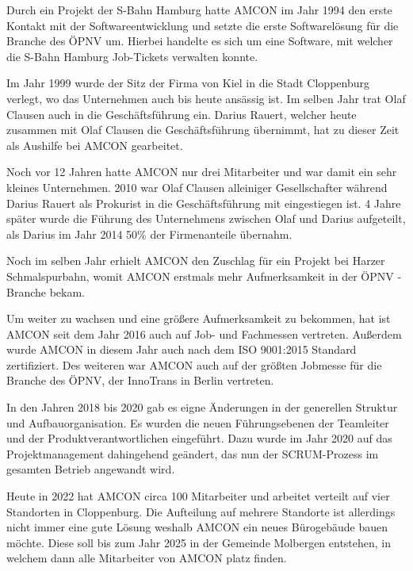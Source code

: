         Durch ein Projekt der S-Bahn Hamburg  hatte AMCON im Jahr 1994 den erste Kontakt mit der Softwareentwicklung
        und setzte die erste Softwarelösung für die Branche des ÖPNV um. Hierbei handelte es sich um eine Software, mit
        welcher die S-Bahn Hamburg Job-Tickets verwalten konnte.

        Im Jahr 1999 wurde der Sitz der Firma von Kiel in die Stadt Cloppenburg verlegt, wo das Unternehmen auch bis 
        heute ansässig ist. Im selben Jahr trat Olaf Clausen auch in die Geschäftsführung ein. Darius Rauert, welcher 
        heute zusammen mit Olaf Clausen die Geschäftsführung übernimmt, hat zu dieser Zeit als Aushilfe bei AMCON 
        gearbeitet.

        Noch vor 12 Jahren hatte AMCON nur drei Mitarbeiter und war damit ein sehr kleines Unternehmen. 2010 war Olaf
        Clausen alleiniger Gesellschafter während Darius Rauert als Prokurist in die Geschäftsführung mit eingestiegen
        ist. 4 Jahre später wurde die Führung des Unternehmens zwischen Olaf und Darius aufgeteilt, als Darius im Jahr
        2014 50\% der Firmenanteile übernahm.

        Noch im selben Jahr erhielt AMCON den Zuschlag für ein Projekt bei Harzer Schmalspurbahn, womit AMCON erstmals
        mehr Aufmerksamkeit in der ÖPNV - Branche bekam.

        Um weiter zu wachsen und eine größere Aufmerksamkeit zu bekommen, hat ist AMCON seit dem Jahr 2016 auch auf 
        Job- und Fachmessen vertreten. Außerdem wurde AMCON in diesem Jahr auch nach dem ISO 9001:2015 Standard 
        zertifiziert. Des weiteren war AMCON auch auf der größten Jobmesse für die Branche des ÖPNV, der InnoTrans in 
        Berlin vertreten.

        In den Jahren 2018 bis 2020 gab es eigne Änderungen in der generellen Struktur und Aufbauorganisation. Es wurden
        die neuen Führungsebenen der Teamleiter und der Produktverantwortlichen eingeführt. Dazu wurde im Jahr 2020 auf
        das Projektmanagement dahingehend geändert, das nun der SCRUM-Prozess im gesamten Betrieb angewandt wird.

        Heute in 2022 hat AMCON circa 100 Mitarbeiter und arbeitet verteilt auf vier Standorten in Cloppenburg. Die 
        Aufteilung auf mehrere Standorte ist allerdings nicht immer eine gute Lösung weshalb AMCON ein neues 
        Bürogebäude bauen möchte. Diese soll bis zum Jahr 2025 in der Gemeinde Molbergen entstehen, in welchem dann alle
        Mitarbeiter von AMCON platz finden.
        \pagebreak

